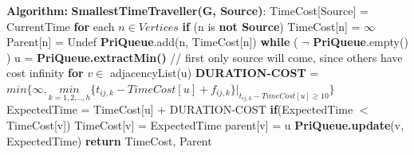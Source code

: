 \documentclass{article}
\newcommand\algo{\vspace{.10in}\textbf{Algorithm: }}
\begin{document}
 \algo \newline
 \textbf {SmallestTimeTraveller(G, Source)}: \newline
 \hspace*{0.5cm} TimeCost[Source] = CurrentTime \newline
 \hspace*{0.5cm} \textbf {for} each $n \in Vertices$ \newline
 \hspace*{1.0cm} 	\textbf {if} (n is \textbf {not Source}) \newline
 \hspace*{1.5cm} 		TimeCost[n] = $\infty$ \newline
 \hspace*{1.5cm} 		Parent[n]   = Undef \newline
 \hspace*{1.0cm} 	\textbf {PriQueue}.add(n, TimeCost[n]) \newline
 \hspace*{0.5cm} \textbf {while} ( $\neg$ \textbf {PriQueue}.empty() ) \newline
 \hspace*{1.0cm} 	u = \textbf {PriQueue.extractMin()} // first only source will come, since others have cost infinity \newline
 \hspace*{1.0cm} 	\textbf {for} $v \in$ adjacencyList(u) \newline
 \hspace*{1.5cm} 		\textbf {DURATION-COST} = $ min \bigg \{ \infty, \underset{k=1,2,..,h}{min}{\{t_{ij,k} - TimeCost[u] + f_{ij,k}\}\bigg |_{t_{ij,k}-TimeCost[u] \geq 10}}  \bigg \}$ \newline
 \hspace*{1.5cm}		ExpectedTime = TimeCost[u] + DURATION-COST \newline
 \hspace*{1.5cm}		\textbf {if}(ExpectedTime $<$ TimeCost[v]) \newline
 \hspace*{2.0cm}			TimeCost[v] = ExpectedTime \newline
 \hspace*{2.0cm}			parent[v]   = u \newline
 \hspace*{2.0cm}			\textbf {PriQueue.update}(v, ExpectedTime) \newline
 \hspace*{0.5cm} \textbf {return} TimeCost, Parent \newline
 \newline
\end{document}
